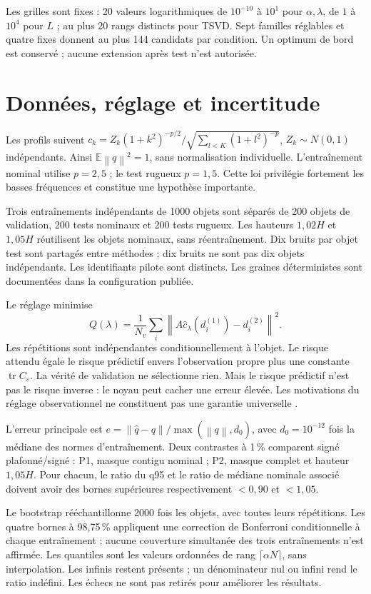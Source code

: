 \documentclass[11pt,a4paper]{article}
\newcommand{\norm}[1]{\left\lVert#1\right\rVert}
\begin{document}
Les grilles sont fixes : 20 valeurs logarithmiques de $10^{-10}$ à $10^1$ pour $\alpha,\lambda$, de $1$ à $10^4$ pour $L$ ; au plus 20 rangs distincts pour TSVD. Sept familles réglables et quatre fixes donnent au plus 144 candidats par condition. Un optimum de bord est conservé ; aucune extension après test n'est autorisée.
\clearpage

\section{Données, réglage et incertitude}
Les profils suivent $c_k=Z_k(1+k^2)^{-p/2}/\sqrt{\sum_{l<K}(1+l^2)^{-p}}$, $Z_k\sim N(0,1)$ indépendants. Ainsi $\mathbb E\norm q^2=1$, sans normalisation individuelle. L'entraînement nominal utilise $p=2,5$ ; le test rugueux $p=1,5$. Cette loi privilégie fortement les basses fréquences et constitue une hypothèse importante.

Trois entraînements indépendants de 1000 objets sont séparés de 200 objets de validation, 200 tests nominaux et 200 tests rugueux. Les hauteurs $1,02H$ et $1,05H$ réutilisent les objets nominaux, sans réentraînement. Dix bruits par objet test sont partagés entre méthodes ; dix bruits ne sont pas dix objets indépendants. Les identifiants pilote sont distincts. Les graines déterministes sont documentées dans la configuration publiée.

Le réglage minimise
\[
Q(\lambda)=\frac1{N_v}\sum_i\norm{A\widehat c_\lambda(d_i^{(1)})-d_i^{(2)}}^2.
\]
Les répétitions sont indépendantes conditionnellement à l'objet. Le risque attendu égale le risque prédictif envers l'observation propre plus une constante $\operatorname{tr}C_\varepsilon$. La vérité de validation ne sélectionne rien. Mais le risque prédictif n'est pas le risque inverse : le noyau peut cacher une erreur élevée. Les motivations du réglage observationnel ne constituent pas une garantie universelle \cite{R06}.

L'erreur principale est $e=\norm{\widehat q-q}/\max(\norm q,d_0)$, avec $d_0=10^{-12}$ fois la médiane des normes d'entraînement. Deux contrastes à 1\,\% comparent signé plafonné/signé : P1, masque contigu nominal ; P2, masque complet et hauteur $1,05H$. Pour chacun, le ratio du q95 et le ratio de médiane nominale associé doivent avoir des bornes supérieures respectivement $<0,90$ et $<1,05$.

Le bootstrap rééchantillonne 2000 fois les objets, avec toutes leurs répétitions. Les quatre bornes à 98,75\,\% appliquent une correction de Bonferroni conditionnelle à chaque entraînement ; aucune couverture simultanée des trois entraînements n'est affirmée. Les quantiles sont les valeurs ordonnées de rang $\lceil\alpha N\rceil$, sans interpolation. Les infinis restent présents ; un dénominateur nul ou infini rend le ratio indéfini. Les échecs ne sont pas retirés pour améliorer les résultats.
\end{document}
